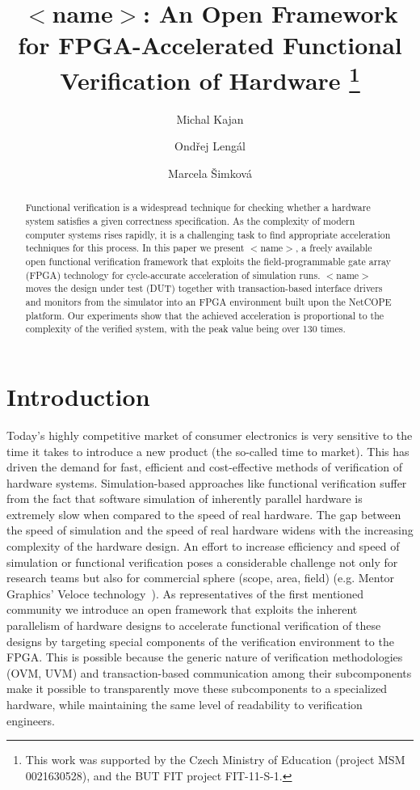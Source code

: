 \documentclass[draft]{llncs}
\title{$<$name$>$: An Open Framework for FPGA-Accelerated Functional Verification 
of Hardware
\thanks{This work was supported by the Czech Ministry of Education (project
MSM 0021630528), and the BUT FIT project FIT-11-S-1.}\vspace*{-0mm}}
\author{Michal Kajan%
\and  Ond\v{r}ej Leng\'{a}l%
\and  Marcela \v{S}imkov\'{a}%
}
\institute{ {FIT, Brno University of Technology, Czech Republic}
}
\begin{document}
 

\maketitle

\vspace*{-0mm}\begin{abstract}Functional verification is a widespread technique 
for checking whether a hardware system satisfies a given correctness specification. 
As the complexity of modern computer systems rises rapidly, it is a challenging 
task to find appropriate acceleration techniques for this process.
In this paper we present $<$name$>$, a freely available open functional
verification framework that exploits the field-programmable gate array (FPGA)
technology for cycle-accurate acceleration of simulation runs.
$<$name$>$ moves the design under test (DUT) together with transaction-based
interface drivers and monitors from the simulator into an FPGA environment built
upon the NetCOPE platform.
Our experiments show that the achieved acceleration is proportional to the
complexity of the verified system, with the peak value being over 130 times.
\end{abstract}

\vspace*{-0mm}\section{Introduction}\vspace*{-0mm}
Today's highly competitive market of consumer electronics is very sensitive to the 
time it takes to introduce a new product (the so-called time to market). This has 
driven the demand for fast, efficient and cost-effective methods of verification 
of hardware systems. Simulation-based approaches like functional verification 
suffer from the fact that software simulation of inherently parallel hardware is 
extremely slow when compared to the speed of real hardware. The gap between the 
speed of simulation and the speed of real hardware widens with the increasing 
complexity of the hardware design. An effort to increase efficiency and speed of 
simulation or functional verification poses a considerable challenge not only for 
research teams but also for commercial sphere (scope, area, field) (e.g. Mentor 
Graphics' Veloce technology~\cite{mentor-veloce}). As representatives of the first mentioned community 
we introduce an open framework that exploits the inherent parallelism of hardware 
designs to accelerate functional verification of these designs by targeting 
special components of the verification environment to the FPGA. This is possible 
because the generic nature of verification methodologies (OVM, UVM) and 
transaction-based communication among their subcomponents make it possible to 
transparently move these subcomponents to a specialized hardware, while 
maintaining the same level of readability to verification engineers.
\end{document}
